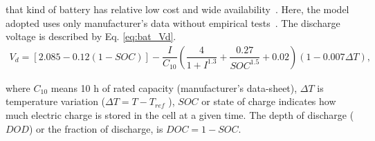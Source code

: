 \documentclass[review]{elsarticle}
\begin{document}
%
%
%
%
that kind of battery has relative low cost and wide availability~\citep{Copetti}. 
%
Here, the model adopted uses only manufacturer's data without empirical tests~\citep{Copetti}. %
%
The discharge voltage is described by Eq. \eqref{eq:bat_Vd}.
%
\begin{multline}
\label{eq:bat_Vd}
V_{d} = \left[ 2.085-0.12(1-SOC) \right] - \dfrac{I}{C_{10}} \left( \dfrac{4}{1+I^{1.3}} + \dfrac{0.27}{SOC^{1.5}}+0.02 \right) (1-0.007 \Delta T),
\end{multline}

\noindent where $C_{10}$ means 10 h of rated capacity (manufacturer's data-sheet), $\Delta T$ is temperature variation ($\Delta T=T-T_{ref} $%
), $ SOC $ or state of charge indicates how much electric charge is stored in the cell at a given time. %
%
%
The depth of discharge ($DOD$) or the fraction of discharge, is $DOC=1-SOC$.
\end{document}
